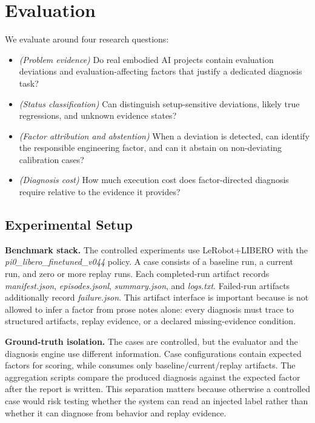 \section{Evaluation}
\label{sec:evaluation}

We evaluate \sys around four research questions:

\begin{itemize}
  \item[\textit{RQ1}] \textit{(Problem evidence)} Do real embodied AI projects contain evaluation deviations and evaluation-affecting factors that justify a dedicated diagnosis task?
  \item[\textit{RQ2}] \textit{(Status classification)} Can \sys distinguish setup-sensitive deviations, likely true regressions, and unknown evidence states?
  \item[\textit{RQ3}] \textit{(Factor attribution and abstention)} When a deviation is detected, can \sys identify the responsible engineering factor, and can it abstain on non-deviating calibration cases?
  \item[\textit{RQ4}] \textit{(Diagnosis cost)} How much execution cost does factor-directed diagnosis require relative to the evidence it provides?
\end{itemize}

\subsection{Experimental Setup}
\label{sub:eval-setup}

\noindent\textbf{Benchmark stack.} The controlled experiments use LeRobot+LIBERO with the \mbox{\emph{pi0\_libero\_finetuned\_v044}} policy. A case consists of a baseline run, a current run, and zero or more replay runs. Each completed-run artifact records \mbox{\emph{manifest.json}}, \mbox{\emph{episodes.jsonl}}, \mbox{\emph{summary.json}}, and \mbox{\emph{logs.txt}}. Failed-run artifacts additionally record \mbox{\emph{failure.json}}. This artifact interface is important because \sys is not allowed to infer a factor from prose notes alone: every diagnosis must trace to structured artifacts, replay evidence, or a declared missing-evidence condition.

\noindent\textbf{Ground-truth isolation.} The cases are controlled, but the evaluator and the diagnosis engine use different information. Case configurations contain expected factors for scoring, while \sys consumes only baseline/current/replay artifacts. The aggregation scripts compare the produced diagnosis against the expected factor after the report is written. This separation matters because otherwise a controlled case would risk testing whether the system can read an injected label rather than whether it can diagnose from behavior and replay evidence.

